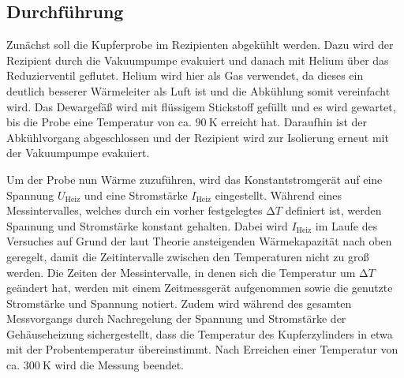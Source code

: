 \subsection{Durchführung}
\label{sec:durchführung}

Zunächst soll die Kupferprobe im Rezipienten abgekühlt werden.
Dazu wird der Rezipient durch die Vakuumpumpe evakuiert und danach mit Helium über das Reduzierventil geflutet.
Helium wird hier als Gas verwendet, da dieses ein deutlich besserer Wärmeleiter als Luft ist und die Abkühlung somit vereinfacht wird.
Das Dewargefäß wird mit flüssigem Stickstoff gefüllt und es wird gewartet, bis die Probe eine Temperatur von ca. $\SI{90}{\kelvin}$ erreicht hat.
Daraufhin ist der Abkühlvorgang abgeschlossen und der Rezipient wird zur Isolierung erneut mit der Vakuumpumpe evakuiert.

Um der Probe nun Wärme zuzuführen, wird das Konstantstromgerät auf eine Spannung $U_{\text{Heiz}}$ und eine Stromstärke $I_{\text{Heiz}}$ eingestellt.
Während eines Messintervalles, welches durch ein vorher festgelegtes $\increment T$ definiert ist, werden Spannung und Stromstärke konstant gehalten.
Dabei wird $I_{\text{Heiz}}$ im Laufe des Versuches auf Grund der laut Theorie ansteigenden Wärmekapazität nach oben geregelt, damit die Zeitintervalle zwischen den Temperaturen nicht zu groß werden.
Die Zeiten der Messintervalle, in denen sich die Temperatur um $\increment T$ geändert hat, werden mit einem Zeitmessgerät aufgenommen sowie die genutzte Stromstärke und Spannung notiert.
Zudem wird während des gesamten Messvorgangs durch Nachregelung der Spannung und Stromstärke der Gehäuseheizung sichergestellt, dass die Temperatur des Kupferzylinders in etwa mit der Probentemperatur übereinstimmt.
Nach Erreichen einer Temperatur von ca. $\SI{300}{\kelvin}$ wird die Messung beendet.
